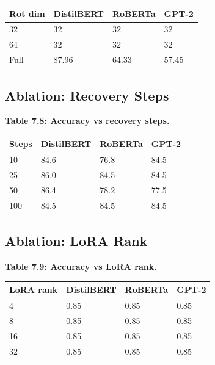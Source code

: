 {\begin{table}[H]
\centering
\small
\begin{tabular}{llll}
\toprule
\textbf{Rot dim} & \textbf{DistilBERT} & \textbf{RoBERTa} & \textbf{GPT-2} \\
\midrule
32 & 32 & 32 & 32 \\
64 & 32 & 32 & 32 \\
Full & 87.96 & 64.33 & 57.45 \\
\bottomrule
\end{tabular}
\end{table}

\subsection{Ablation: Recovery Steps}

\textbf{Table 7.8: Accuracy vs recovery steps.}

\begin{table}[H]
\centering
\small
\begin{tabular}{llll}
\toprule
\textbf{Steps} & \textbf{DistilBERT} & \textbf{RoBERTa} & \textbf{GPT-2} \\
\midrule
10 & 84.6 & 76.8 & 84.5 \\
25 & 86.0 & 84.5 & 84.5 \\
50 & 86.4 & 78.2 & 77.5 \\
100 & 84.5 & 84.5 & 84.5 \\
\bottomrule
\end{tabular}
\end{table}

\subsection{Ablation: LoRA Rank}

\textbf{Table 7.9: Accuracy vs LoRA rank.}

\begin{table}[H]
\centering
\small
\begin{tabular}{llll}
\toprule
\textbf{LoRA rank} & \textbf{DistilBERT} & \textbf{RoBERTa} & \textbf{GPT-2} \\
\midrule
4 & 0.85 & 0.85 & 0.85 \\
8 & 0.85 & 0.85 & 0.85 \\
16 & 0.85 & 0.85 & 0.85 \\
32 & 0.85 & 0.85 & 0.85 \\
\bottomrule
\end{tabular}
\end{table}

}
